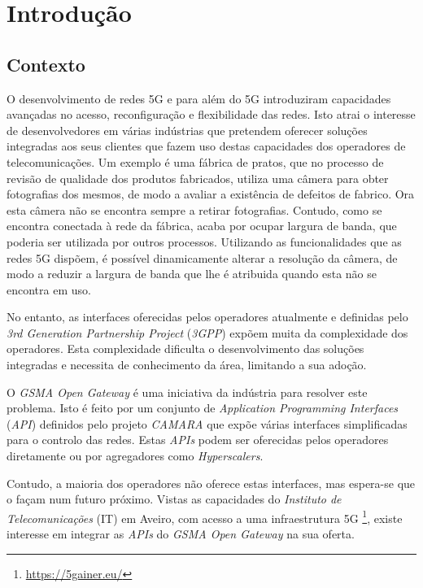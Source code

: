 \chapter{Introdução}

\section{Contexto}

O desenvolvimento de redes 5G e para além do 5G introduziram capacidades
avançadas no acesso, reconfiguração e flexibilidade das redes. Isto atrai o
interesse de desenvolvedores em várias indústrias que pretendem oferecer
soluções integradas aos seus clientes que fazem uso destas capacidades dos
operadores de telecomunicações. Um exemplo é uma fábrica de pratos,
que no processo de revisão de qualidade dos produtos fabricados, utiliza uma câmera para obter fotografias dos mesmos,
de modo a avaliar a existência de defeitos de fabrico. 
Ora esta câmera não se encontra sempre a retirar fotografias. Contudo,  como se encontra conectada à rede da fábrica,
acaba por ocupar largura de banda, que poderia ser
utilizada por outros processos. Utilizando as funcionalidades que 
as redes 5G dispõem, é possível dinamicamente
alterar a resolução da câmera, de modo a reduzir a largura de 
banda que lhe é atribuida quando esta não se encontra em uso.

No entanto, as interfaces oferecidas pelos
operadores atualmente e definidas pelo \emph{3rd Generation Partnership
Project} (\emph{3GPP}) expõem muita da complexidade dos operadores. Esta complexidade
dificulta o desenvolvimento das soluções integradas e necessita de conhecimento
da área, limitando a sua adoção.

O \emph{GSMA Open Gateway} é uma iniciativa da indústria para resolver este
problema. Isto é feito por um conjunto de \emph{Application Programming
Interfaces} (\emph{API}) definidos pelo projeto \emph{CAMARA} que expõe várias
interfaces simplificadas para o controlo das redes. Estas \emph{APIs} podem ser
oferecidas pelos operadores diretamente ou por agregadores como
\emph{Hyperscalers}.

Contudo, a maioria dos operadores não oferece estas interfaces, mas espera-se
que o façam num futuro próximo. Vistas as capacidades do \emph{Instituto de
Telecomunicações} (IT) em Aveiro, com acesso a uma infraestrutura 5G
\footnote{\url{https://5gainer.eu/}}\cite{ieee:5GAIner}, existe interesse em
integrar as \emph{APIs} do \emph{GSMA Open Gateway} na sua oferta.

